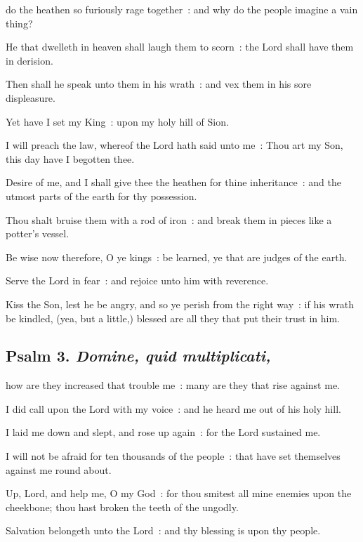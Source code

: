  do the heathen so furiously rage together~: and why do the people imagine a vain thing?\par
{}
He that dwelleth in heaven shall laugh them to scorn~: the Lord shall have them in derision.\par
{}Then shall he speak unto them in his wrath~: and vex them in his sore displeasure.\par
{}Yet have I set my King~: upon my holy hill of Sion.\par
{}I will preach the law, whereof the Lord hath said unto me~: Thou art my Son, this day have I begotten thee.\par
{}Desire of me, and I shall give thee the heathen for thine inheritance~: and the utmost parts of the earth for thy possession.\par
{}Thou shalt bruise them with a rod of iron~: and break them in pieces like a potter's vessel.\par
{}Be wise now therefore, O ye kings~: be learned, ye that are judges of the earth.\par
{}Serve the Lord in fear~: and rejoice unto him with reverence.\par
{}Kiss the Son, lest he be angry, and so ye perish from the right way~: if his wrath be kindled, (yea, but a little,) blessed are all they that put their trust in him.\par

\subsection{Psalm 3. \textit{Domine, quid multiplicati,}}


 how are they increased that trouble me~: many are they that rise against me.\par
{}
I did call upon the Lord with my voice~: and he heard me out of his holy hill.\par
{}I laid me down and slept, and rose up again~: for the Lord sustained me.\par
{}I will not be afraid for ten thousands of the people~: that have set themselves against me round about.\par
{}Up, Lord, and help me, O my God~: for thou smitest all mine enemies upon the cheekbone; thou hast broken the teeth of the ungodly.\par
{}Salvation belongeth unto the Lord~: and thy blessing is upon thy people.\par

